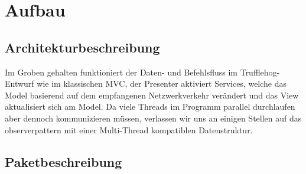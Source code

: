 \chapter{Aufbau \programname}

\section{Architekturbeschreibung}
Im Groben gehalten funktioniert der Daten- und Befehlsfluss im Trufflehog-Entwurf
wie im klassischen MVC, der Presenter aktiviert Services, welche das Model basierend
auf dem empfangenen Netzwerkverkehr verändert und das View aktualisiert sich am Model.
Da viele Threads im Programm parallel durchlaufen aber dennoch kommunizieren müssen,
verlassen wir uns an einigen Stellen auf das \gls{observerpattern} mit einer
Multi-Thread kompatiblen Datenstruktur.\newline
\newline

\section{Paketbeschreibung}

